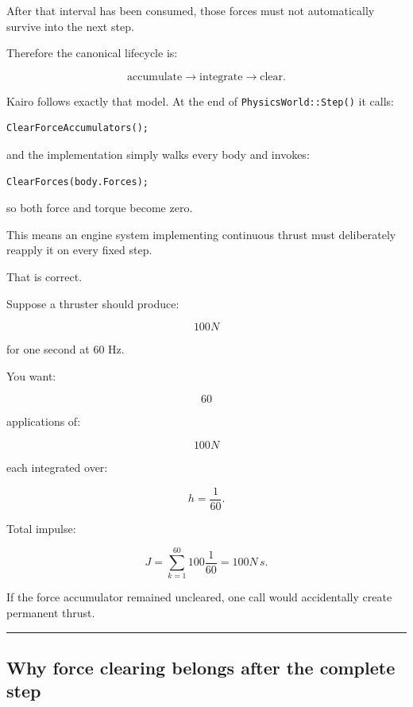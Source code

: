 After that interval has been consumed, those forces must not automatically survive into the next step.

Therefore the canonical lifecycle is:

\[
\boxed{
\text{accumulate}
\rightarrow
\text{integrate}
\rightarrow
\text{clear}.
}
\]

Kairo follows exactly that model. At the end of \texttt{PhysicsWorld::Step()} it calls:

\begin{verbatim}
ClearForceAccumulators();
\end{verbatim}

and the implementation simply walks every body and invokes:

\begin{verbatim}
ClearForces(body.Forces);
\end{verbatim}

so both force and torque become zero.

This means an engine system implementing continuous thrust must deliberately reapply it on every fixed step.

That is correct.

Suppose a thruster should produce:

\[
100N
\]

for one second at 60 Hz.

You want:

\[
60
\]

applications of:

\[
100N
\]

each integrated over:

\[
h=\frac1{60}.
\]

Total impulse:

\[
J
=
\sum_{k=1}^{60}
100\frac1{60}
=
100N\,s.
\]

If the force accumulator remained uncleared, one call would accidentally create permanent thrust.

\begin{center}\rule{0.5\linewidth}{0.5pt}\end{center}

\subsection{Why force clearing belongs after the complete step}\label{06-engine-ii-ch038-why-force-clearing-belongs-after-the-complete-step}

\hypertarget{06-engine-ii-ch038-why-force-clearing-belongs-after-the-complete-step}{}

